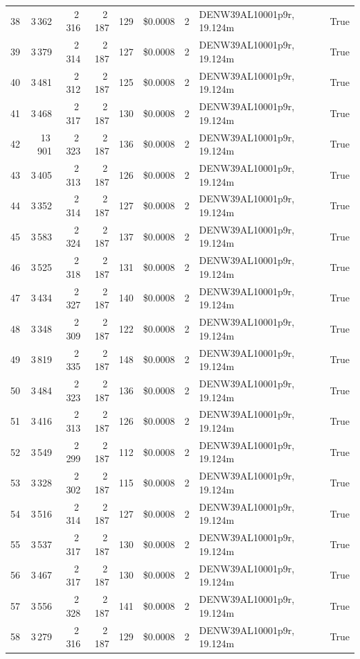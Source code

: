 \documentclass[a4paper,11pt]{article}
\begin{document}
\begin{table}[ht]
\begin{tabular}{r r r r r r r p{3cm} l}
38 & 3\,362 & 2\,316 & 2\,187 & 129 & \$0.0008 & 2 & DENW39AL10001p9r, 19.124m & True \\
39 & 3\,379 & 2\,314 & 2\,187 & 127 & \$0.0008 & 2 & DENW39AL10001p9r, 19.124m & True \\
40 & 3\,481 & 2\,312 & 2\,187 & 125 & \$0.0008 & 2 & DENW39AL10001p9r, 19.124m & True \\
41 & 3\,468 & 2\,317 & 2\,187 & 130 & \$0.0008 & 2 & DENW39AL10001p9r, 19.124m & True \\
42 & 13\,901 & 2\,323 & 2\,187 & 136 & \$0.0008 & 2 & DENW39AL10001p9r, 19.124m & True \\
43 & 3\,405 & 2\,313 & 2\,187 & 126 & \$0.0008 & 2 & DENW39AL10001p9r, 19.124m & True \\
44 & 3\,352 & 2\,314 & 2\,187 & 127 & \$0.0008 & 2 & DENW39AL10001p9r, 19.124m & True \\
45 & 3\,583 & 2\,324 & 2\,187 & 137 & \$0.0008 & 2 & DENW39AL10001p9r, 19.124m & True \\
46 & 3\,525 & 2\,318 & 2\,187 & 131 & \$0.0008 & 2 & DENW39AL10001p9r, 19.124m & True \\
47 & 3\,434 & 2\,327 & 2\,187 & 140 & \$0.0008 & 2 & DENW39AL10001p9r, 19.124m & True \\
48 & 3\,348 & 2\,309 & 2\,187 & 122 & \$0.0008 & 2 & DENW39AL10001p9r, 19.124m & True \\
49 & 3\,819 & 2\,335 & 2\,187 & 148 & \$0.0008 & 2 & DENW39AL10001p9r, 19.124m & True \\
50 & 3\,484 & 2\,323 & 2\,187 & 136 & \$0.0008 & 2 & DENW39AL10001p9r, 19.124m & True \\
51 & 3\,416 & 2\,313 & 2\,187 & 126 & \$0.0008 & 2 & DENW39AL10001p9r, 19.124m & True \\
52 & 3\,549 & 2\,299 & 2\,187 & 112 & \$0.0008 & 2 & DENW39AL10001p9r, 19.124m & True \\
53 & 3\,328 & 2\,302 & 2\,187 & 115 & \$0.0008 & 2 & DENW39AL10001p9r, 19.124m & True \\
54 & 3\,516 & 2\,314 & 2\,187 & 127 & \$0.0008 & 2 & DENW39AL10001p9r, 19.124m & True \\
55 & 3\,537 & 2\,317 & 2\,187 & 130 & \$0.0008 & 2 & DENW39AL10001p9r, 19.124m & True \\
56 & 3\,467 & 2\,317 & 2\,187 & 130 & \$0.0008 & 2 & DENW39AL10001p9r, 19.124m & True \\
57 & 3\,556 & 2\,328 & 2\,187 & 141 & \$0.0008 & 2 & DENW39AL10001p9r, 19.124m & True \\
58 & 3\,279 & 2\,316 & 2\,187 & 129 & \$0.0008 & 2 & DENW39AL10001p9r, 19.124m & True \\

\end{tabular}
\end{table}
\end{document}
